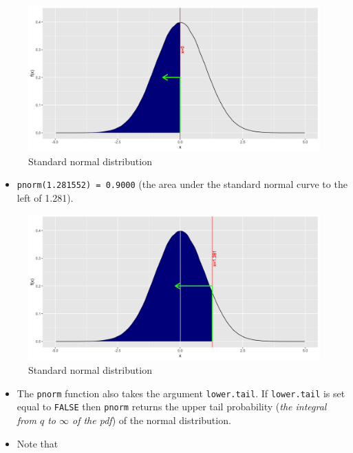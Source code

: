 \documentclass[]{book}
\providecommand{\tightlist}{%
  \setlength{\itemsep}{0pt}\setlength{\parskip}{0pt}}
\begin{document}
\begin{figure}

{\centering \includegraphics{figure/norm1-1} 

}

\caption{Standard normal distribution}\label{fig:norm1}
\end{figure}

\begin{itemize}
\tightlist
\item
  \texttt{pnorm(1.281552)\ =\ 0.9000} (the area under the standard normal curve to the left of 1.281).
\end{itemize}

\begin{figure}

{\centering \includegraphics{figure/norm2-1} 

}

\caption{Standard normal distribution}\label{fig:norm2}
\end{figure}

\begin{itemize}
\item
  The \texttt{pnorm} function also takes the argument \texttt{lower.tail}. If \texttt{lower.tail} is set equal to \texttt{FALSE} then \texttt{pnorm} returns the upper tail probability (\emph{the integral from \(q\) to \(\infty\) of the pdf}) of the normal distribution.
\item
  Note that
\end{itemize}
\end{document}
